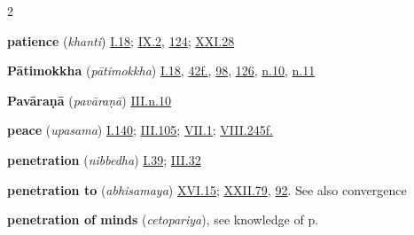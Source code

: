 \begin{multicols}{2}
\begin{vismHanging}
\par\textbf{patience} (\emph{khanti}) \hyperlink{I.18}{I.18}{}; \hyperlink{IX.2}{IX.2}{}, \hyperlink{IX.124}{124}{}; \hyperlink{XXI.28}{XXI.28}{}
\par\textbf{Pātimokkha} (\emph{pātimokkha}) \hyperlink{I.18}{I.18}{}, \hyperlink{I.42}{42f.}{}, \hyperlink{I.98}{98}{}, \hyperlink{I.126}{126}{}, \hyperlink{I.n10}{n.10}{}, \hyperlink{I.n11}{n.11}{}
\par\textbf{Pavāraṇā} (\emph{pavāraṇā}) \hyperlink{III.n10}{III.n.10}{}
\par\textbf{peace} (\emph{upasama}) \hyperlink{I.140}{I.140}{}; \hyperlink{III.105}{III.105}{}; \hyperlink{VII.1}{VII.1}{}; \hyperlink{VIII.245}{VIII.245f.}{}
\par\textbf{penetration} (\emph{nibbedha}) \hyperlink{I.39}{I.39}{}; \hyperlink{III.32}{III.32}{}
\par\textbf{penetration to} (\emph{abhisamaya}) \hyperlink{XVI.15}{XVI.15}{}; \hyperlink{XXII.79}{XXII.79}{}, \hyperlink{XXII.92}{92}{}. See also convergence 
\par\textbf{penetration of minds} (\emph{cetopariya}), see knowledge of p. 

\end{vismHanging}
\end{multicols}
